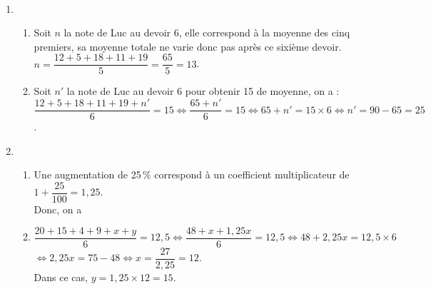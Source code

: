 \ \\ [-5mm]
\begin{enumerate}
      \item
      \begin{enumerate}
         \item Soit $n$ la note de Luc au devoir 6, elle correspond à la moyenne des cinq premiers, sa moyenne totale ne varie donc pas après ce sixième devoir. \\ [1mm]
         $n =\dfrac{12+5+18+11+19}{5} =\dfrac{65}{5} =13$. \\ [1mm]
         \smallskip
         \item Soit $n'$ la note de Luc au devoir 6 pour obtenir 15 de moyenne, on a : \\
         $\dfrac{12+5+18+11+19+n'}{6} =15 \iff \dfrac{65+n'}{6}=15 \iff 65+n' =15\times6 \iff n' =90-65 =25$. \\ [1mm]
      \end{enumerate}
      \item
      \begin{enumerate}
         \item Une augmentation de 25\,\% correspond à un coefficient multiplicateur de $1+\dfrac{25}{100} =1,25$. \\
         Donc, on a 
         \smallskip
         \item $\dfrac{20+15+4+9+x+y}{6} =12,5 \iff \dfrac{48+x+1,25x}{6}=12,5 \iff 48+2,25x =12,5\times6$ \\
         \hspace*{4.95cm} $\iff 2,25x =75-48 \iff x =\dfrac{27}{2,25} =12$. \\
         Dans ce cas, $y=1,25\times12 =15$. \\
      \end{enumerate}
   \end{enumerate}

